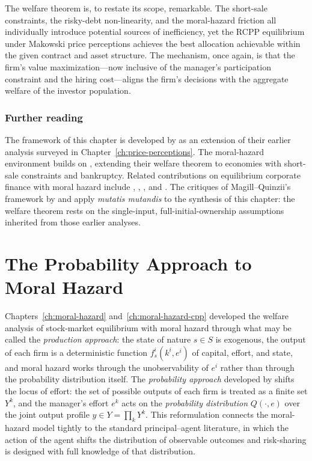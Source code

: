 \documentclass[11pt,a4paper,oneside]{book}
\theoremstyle{plain}
\theoremstyle{definition}
\theoremstyle{remark}
\numberwithin{equation}{chapter}
\begin{document}
The welfare theorem is, to restate its scope, remarkable.
The short-sale constraints, the risky-debt non-linearity, and the moral-hazard friction all individually introduce potential sources of inefficiency, yet the RCPP equilibrium under Makowski price perceptions achieves the best allocation achievable within the given contract and asset structure.
The mechanism, once again, is that the firm's value maximization---now inclusive of the manager's participation constraint and the hiring cost---aligns the firm's decisions with the aggregate welfare of the investor population.

\subsection{Further reading}

The framework of this chapter is developed by \citet{BisinGottardiRuta2015} as an extension of their earlier analysis surveyed in Chapter~\ref{ch:price-perceptions}.
The moral-hazard environment builds on \citet{MagillQuinzii2002}, extending their welfare theorem to economies with short-sale constraints and bankruptcy.
Related contributions on equilibrium corporate finance with moral hazard include \citet{KihlstromMatthews1990}, \citet{Kocherlakota1998}, \citet{BisinGottardiRampini2008}, and \citet{AcharyaBisin2009}.
The critiques of Magill--Quinzii's framework by \citet{CalcagnoWagner2006} and \citet{QuigginChambers2006} apply \emph{mutatis mutandis} to the synthesis of this chapter: the welfare theorem rests on the single-input, full-initial-ownership assumptions inherited from those earlier analyses.

\chapter{The Probability Approach to Moral Hazard}
\label{ch:prob-approach}

Chapters~\ref{ch:moral-hazard} and~\ref{ch:moral-hazard-cpp} developed the welfare analysis of stock-market equilibrium with moral hazard through what may be called the \emph{production approach}: the state of nature $s \in S$ is exogenous, the output of each firm is a deterministic function $f^i_s(k^i, e^i)$ of capital, effort, and state, and moral hazard works through the unobservability of $e^i$ rather than through the probability distribution itself.
The \emph{probability approach} developed by \citet{MagillQuinzii2008} shifts the locus of effort: the set of possible outputs of each firm is treated as a finite set $Y^k$, and the manager's effort $e^k$ acts on the \emph{probability distribution} $Q(\cdot, e)$ over the joint output profile $y \in Y = \prod_k Y^k$.
This reformulation connects the moral-hazard model tightly to the standard principal--agent literature, in which the action of the agent shifts the distribution of observable outcomes and risk-sharing is designed with full knowledge of that distribution.
\end{document}
